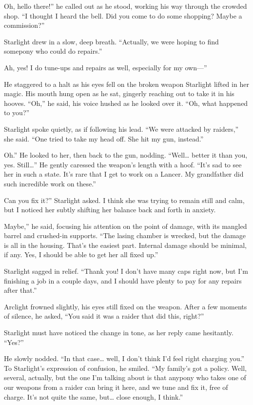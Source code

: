 \leavevmode{}Oh, hello there!” he called out as he stood, working his way through the crowded shop. “I thought I heard the bell. Did you come to do some shopping? Maybe a commission?”

Starlight drew in a slow, deep breath. “Actually, we were hoping to find somepony who could do repairs.”

\leavevmode{}Ah, yes! I do tune-ups and repairs as well, especially for my own—”

He staggered to a halt as his eyes fell on the broken weapon Starlight lifted in her magic. His mouth hung open as he sat, gingerly reaching out to take it in his hooves. “Oh,” he said, his voice hushed as he looked over it. “Oh, what happened to you?”

Starlight spoke quietly, as if following his lead. “We were attacked by raiders,” she said. “One tried to take my head off. She hit my gun, instead.”

\leavevmode{}Oh.” He looked to her, then back to the gun, nodding. “Well… better it than you, yes. Still…” He gently caressed the weapon’s length with a hoof. “It’s sad to see her in such a state. It’s rare that I get to work on a Lancer. My grandfather did such incredible work on these.”

\leavevmode{}Can you fix it?” Starlight asked. I think she was trying to remain still and calm, but I noticed her subtly shifting her balance back and forth in anxiety.

\leavevmode{}Maybe,” he said, focusing his attention on the point of damage, with its mangled barrel and crushed-in supports. “The lasing chamber is wrecked, but the damage is all in the housing. That’s the easiest part. Internal damage should be minimal, if any. Yes, I should be able to get her all fixed up.”

Starlight sagged in relief. “Thank you! I don’t have many caps right now, but I’m finishing a job in a couple days, and I should have plenty to pay for any repairs after that.”

Arclight frowned slightly, his eyes still fixed on the weapon. After a few moments of silence, he asked, “You said it was a raider that did this, right?”

Starlight must have noticed the change in tone, as her reply came hesitantly. “Yes?”

He slowly nodded. “In that case… well, I don’t think I’d feel right charging you.” To Starlight’s expression of confusion, he smiled. “My family’s got a policy. Well, several, actually, but the one I’m talking about is that anypony who takes one of our weapons from a raider can bring it here, and we tune and fix it, free of charge. It’s not quite the same, but… close enough, I think.”

